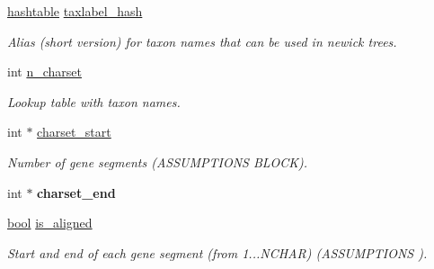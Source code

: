\begin{DoxyCompactItemize}
\mbox{\label{structalignment__struct_ad0a2760951cbd2698aba10eb383ef942}} 
\hyperlink{structhashtable__struct}{hashtable} \hyperlink{structalignment__struct_ad0a2760951cbd2698aba10eb383ef942}{taxlabel\+\_\+hash}
\begin{DoxyCompactList}\small\item\em Alias (short version) for taxon names that can be used in newick trees. \end{DoxyCompactList}\item 
\mbox{\label{structalignment__struct_a18e5ad5b8fc356f20affd880be869405}} 
int \hyperlink{structalignment__struct_a18e5ad5b8fc356f20affd880be869405}{n\+\_\+charset}
\begin{DoxyCompactList}\small\item\em Lookup table with taxon names. \end{DoxyCompactList}\item 
\mbox{\label{structalignment__struct_aabaec777f714bc9b052a667b95686fc0}} 
int $\ast$ \hyperlink{structalignment__struct_aabaec777f714bc9b052a667b95686fc0}{charset\+\_\+start}
\begin{DoxyCompactList}\small\item\em Number of gene segments (A\+S\+S\+U\+M\+P\+T\+I\+O\+NS B\+L\+O\+CK). \end{DoxyCompactList}\item 
\mbox{\label{structalignment__struct_a667699e9b5ed61cec6fae87b0db11084}} 
int $\ast$ {\bfseries charset\+\_\+end}
\item 
\mbox{\label{structalignment__struct_a494093c32d2dcb61907f0e90c43fefd3}} 
\hyperlink{lowlevel_8h_a97a80ca1602ebf2303258971a2c938e2}{bool} \hyperlink{structalignment__struct_a494093c32d2dcb61907f0e90c43fefd3}{is\+\_\+aligned}
\begin{DoxyCompactList}\small\item\em Start and end of each gene segment (from 1...N\+C\+H\+AR) (A\+S\+S\+U\+M\+P\+T\+I\+O\+NS ). \end{DoxyCompactList}\item 
\mbox{\label{structalignment__struct_ab599779f0254908bf21a78a503ee71bf}} 

\end{DoxyCompactItemize}
